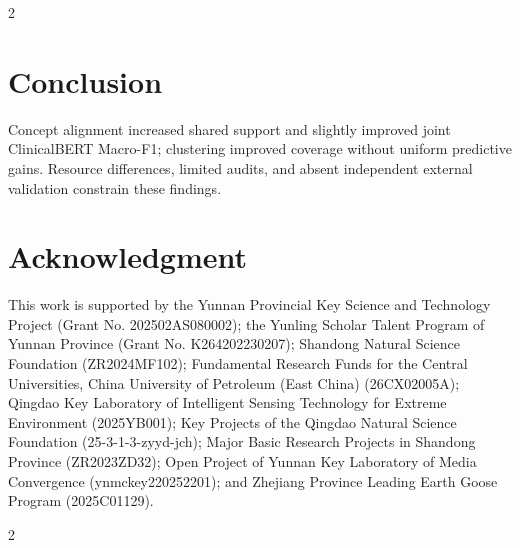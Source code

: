 \documentclass[a4paper,conference]{IEEEtran}
\begin{document}
\begin{multicols}{2}
\section{Conclusion}
Concept alignment increased shared support and slightly improved joint ClinicalBERT Macro-F1; clustering improved coverage without uniform predictive gains. Resource differences, limited audits, and absent independent external validation constrain these findings.

\section*{Acknowledgment}
This work is supported by the Yunnan Provincial Key Science and Technology Project (Grant No. 202502AS080002); the Yunling Scholar Talent Program of Yunnan Province (Grant No. K264202230207); Shandong Natural Science Foundation (ZR2024MF102); Fundamental Research Funds for the Central Universities, China University of Petroleum (East China) (26CX02005A); Qingdao Key Laboratory of Intelligent Sensing Technology for Extreme Environment (2025YB001); Key Projects of the Qingdao Natural Science Foundation (25-3-1-3-zyyd-jch); Major Basic Research Projects in Shandong Province (ZR2023ZD32); Open Project of Yunnan Key Laboratory of Media Convergence (ynmckey220252201); and Zhejiang Province Leading Earth Goose Program (2025C01129).

\end{multicols}
\clearpage
\begin{multicols}{2}
\begingroup
\footnotesize
\NTCIReferenceFont

\endgroup
\end{multicols}
\end{document}
